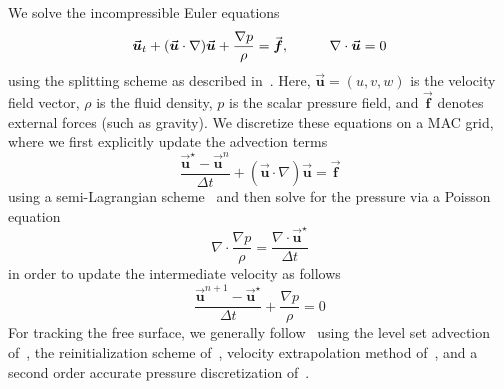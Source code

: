 We solve the incompressible Euler equations
$$
\vec{\boldsymbol{u}}_t+(\vec{\boldsymbol{u}}\cdot\nabla)\vec{\boldsymbol{u}} + \frac{\nabla p}{\rho} = \vec{\boldsymbol{f}}, \hspace{.4in}
\nabla\cdot\vec{\boldsymbol{u}} = 0
$$
using the splitting scheme as described in~\cite{Stam:1999:StableFluids}. Here,
$\vec{\boldsymbol{u}}=(u,v,w)$ is the velocity field vector, $\rho$ is the
fluid density, $p$ is the scalar pressure field, and
$\vec{\boldsymbol{f}}$ denotes external forces (such as gravity).
We discretize these equations on a MAC grid, where we first explicitly update
the advection terms
$$
\label{eqn:advection}
\frac{\vec{\boldsymbol{u}}^\star-\vec{\boldsymbol{u}}^n}{\Delta t}+(\vec{\boldsymbol{u}}\cdot\nabla)\vec{\boldsymbol{u}} = \vec{\boldsymbol{f}}
$$
using a semi-Lagrangian scheme~\cite{Selle:2008:MacCormack} and then solve for the
pressure via a Poisson equation
$$
\nabla\cdot\frac{\nabla p}{\rho}=\frac{\nabla\cdot\vec{\boldsymbol{u}}^\star}{\Delta t}
$$
in order to update the intermediate velocity as follows
$$
\frac{\vec{\boldsymbol{u}}^{n+1}-\vec{\boldsymbol{u}}^\star}{\Delta t}+\frac{\nabla p}{\rho}=0
$$
For tracking the free surface, we generally follow~\cite{Enright:2002:ARC} using the
level set advection of~\cite{Enright:2005:FAS}, the
reinitialization scheme of~\cite{Losasso:2005:SATLMIF}, velocity extrapolation method of~\cite{Adalsteinsson:1999:FCEVLS},
and a second order accurate pressure discretization of~\cite{Enright:2003:UTP}.

